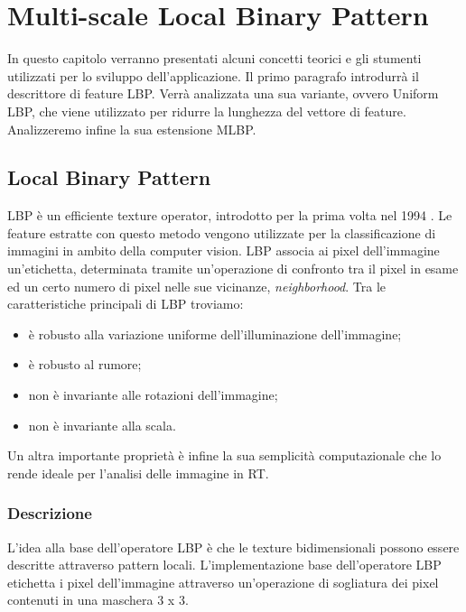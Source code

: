 \section{Multi-scale Local Binary Pattern}
In questo capitolo verranno presentati alcuni concetti teorici e gli stumenti utilizzati per lo sviluppo dell'applicazione. Il primo paragrafo introdurrà il descrittore di feature \acf{LBP}. Verrà analizzata una sua variante, ovvero Uniform \acs{LBP}, che viene utilizzato per ridurre la lunghezza del vettore di feature. Analizzeremo infine la sua estensione \acf{MLBP}.

\subsection{Local Binary Pattern}

\acf{LBP} è un efficiente texture operator, introdotto per la prima volta nel 1994 \cite{LBPfirst}. Le feature estratte con questo metodo vengono utilizzate per la classificazione di immagini in ambito della computer vision.
\acs{LBP} associa ai pixel dell'immagine un'etichetta, determinata tramite un'operazione di confronto tra il pixel in esame ed un certo numero di pixel nelle sue vicinanze, \emph{neighborhood}.
Tra le caratteristiche principali di \acs{LBP} troviamo:

\begin{itemize}
	\item è robusto alla variazione uniforme dell'illuminazione dell'immagine;
	\item è robusto al rumore;
	\item non è invariante alle rotazioni dell'immagine;
	\item non è invariante alla scala.
\end{itemize}

Un altra importante proprietà è infine la sua semplicità computazionale che lo rende ideale per l'analisi delle immagine in \acf{RT}.

\subsubsection{Descrizione}

L'idea alla base dell'operatore \acf{LBP} è che le texture bidimensionali possono essere descritte attraverso pattern locali.
L'implementazione base dell'operatore \acs{LBP} etichetta i pixel dell'immagine attraverso un'operazione di sogliatura dei pixel contenuti in una maschera 3 x 3.

